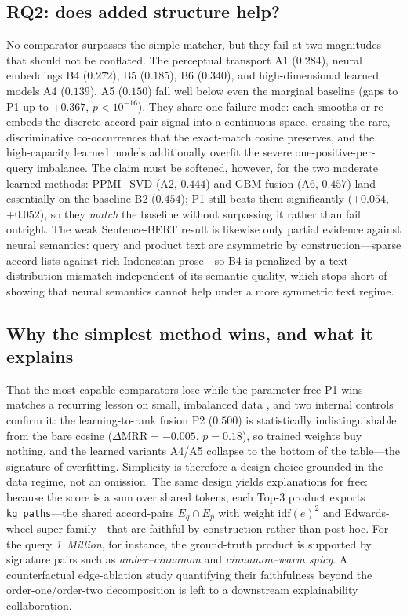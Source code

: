 \documentclass[conference]{IEEEtran}
\begin{document}
\subsection{RQ2: does added structure help?}
No comparator surpasses the simple matcher, but they fail at two magnitudes that should
not be conflated. The perceptual transport A1 ($0.284$), neural embeddings B4 ($0.272$),
B5 ($0.185$), B6 ($0.340$), and high-dimensional learned models A4 ($0.139$), A5 ($0.150$)
fall well below even the marginal baseline (gaps to P1 up to $+0.367$, $p<10^{-16}$). They
share one failure mode: each smooths or re-embeds the discrete accord-pair signal into a
continuous space, erasing the rare, discriminative co-occurrences that the exact-match
cosine preserves, and the high-capacity learned models additionally overfit the severe
one-positive-per-query imbalance. The claim must be softened, however, for the two moderate
learned methods: PPMI+SVD (A2, $0.444$) and GBM fusion (A6, $0.457$) land essentially on
the baseline B2 ($0.454$); P1 still beats them significantly ($+0.054$, $+0.052$), so they
\emph{match} the baseline without surpassing it rather than fail outright. The weak
Sentence-BERT result is likewise only partial evidence against neural semantics: query and
product text are asymmetric by construction---sparse accord lists against rich Indonesian
prose---so B4 is penalized by a text-distribution mismatch independent of its semantic
quality, which stops short of showing that neural semantics cannot help under a more
symmetric text regime.

\subsection{Why the simplest method wins, and what it explains}
That the most capable comparators lose while the parameter-free P1 wins matches a recurring
lesson on small, imbalanced data \cite{r14,r15,r16,r17}, and two internal controls confirm
it: the learning-to-rank fusion P2 ($0.500$) is statistically indistinguishable from the
bare cosine ($\Delta\mathrm{MRR}=-0.005$, $p=0.18$), so trained weights buy nothing, and
the learned variants A4/A5 collapse to the bottom of the table---the signature of
overfitting. Simplicity is therefore a design choice grounded in the data regime, not an
omission. The same design yields explanations for free: because the score is a sum over
shared tokens, each Top-3 product exports \texttt{kg\_paths}---the shared accord-pairs
$E_q\cap E_p$ with weight $\mathrm{idf}(e)^2$ and Edwards-wheel super-family---that are
faithful by construction rather than post-hoc. For the query \textit{1~Million}, for
instance, the ground-truth product is supported by signature pairs such as
\textit{amber--cinnamon} and \textit{cinnamon--warm spicy}. A counterfactual edge-ablation study quantifying their
faithfulness beyond the order-one/order-two decomposition is left to a downstream
explainability collaboration.
\end{document}

